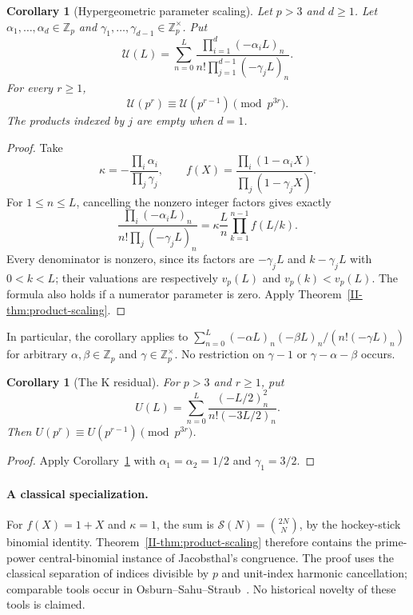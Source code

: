 \documentclass[11pt,letterpaper]{article}
\newtheorem{corollary}[theorem]{Corollary}
\numberwithin{equation}{section}
\begin{document}
\begin{corollary}[Hypergeometric parameter scaling]
\label{II-thm:gauss-scaling}
Let $p>3$ and $d\geq1$. Let $\alpha_1,\ldots,\alpha_d\in\mathbb Z_p$
and $\gamma_1,\ldots,\gamma_{d-1}\in\mathbb Z_p^\times$. Put
\[
\mathcal U(L)=\sum_{n=0}^{L}
\frac{\prod_{i=1}^{d}(-\alpha_i L)_n}
 {n!\prod_{j=1}^{d-1}(-\gamma_j L)_n}.
\]
For every $r\geq1$,
\[
\mathcal U(p^r)\equiv\mathcal U(p^{r-1})\pmod{p^{3r}}.
\]
The products indexed by $j$ are empty when $d=1$.
\end{corollary}
\begin{proof}
Take
\[
\kappa=-\frac{\prod_i\alpha_i}{\prod_j\gamma_j},\qquad
f(X)=\frac{\prod_i(1-\alpha_iX)}{\prod_j(1-\gamma_jX)}.
\]
For $1\leq n\leq L$, cancelling the nonzero integer factors gives
exactly
\[
\frac{\prod_i(-\alpha_iL)_n}
 {n!\prod_j(-\gamma_jL)_n}
=\kappa\frac{L}{n}\prod_{k=1}^{n-1}f(L/k).
\]
Every denominator is nonzero, since its factors are $-\gamma_jL$
and $k-\gamma_jL$ with $0<k<L$; their valuations are respectively
$v_p(L)$ and $v_p(k)<v_p(L)$. The formula also holds if a numerator
parameter is zero. Apply Theorem~\ref{II-thm:product-scaling}.
\end{proof}

In particular, the corollary applies to
$\sum_{n=0}^{L}(-\alpha L)_n(-\beta L)_n/(n!(-\gamma L)_n)$
for arbitrary $\alpha,\beta\in\mathbb Z_p$ and
$\gamma\in\mathbb Z_p^\times$. No restriction on $\gamma-1$ or
$\gamma-\alpha-\beta$ occurs.

\begin{corollary}[The K residual]\label{II-cor:K-residual}
For $p>3$ and $r\geq1$, put
\[
U(L)=\sum_{n=0}^{L}\frac{(-L/2)_n^2}{n!(-3L/2)_n}.
\]
Then $U(p^r)\equiv U(p^{r-1})\pmod{p^{3r}}$.
\end{corollary}
\begin{proof}
Apply Corollary~\ref{II-thm:gauss-scaling} with
$\alpha_1=\alpha_2=1/2$ and $\gamma_1=3/2$.
\end{proof}

\paragraph{A classical specialization.}
For $f(X)=1+X$ and $\kappa=1$, the sum is
$\mathcal S(N)=\binom{2N}{N}$, by the hockey-stick binomial identity.
Theorem~\ref{II-thm:product-scaling} therefore contains the prime-power
central-binomial instance of Jacobsthal's congruence. The proof uses
the classical separation of indices divisible by $p$ and unit-index
harmonic cancellation; comparable tools occur in
Osburn--Sahu--Straub~\cite{II-OSS}. No historical novelty of these tools
is claimed.
\end{document}
